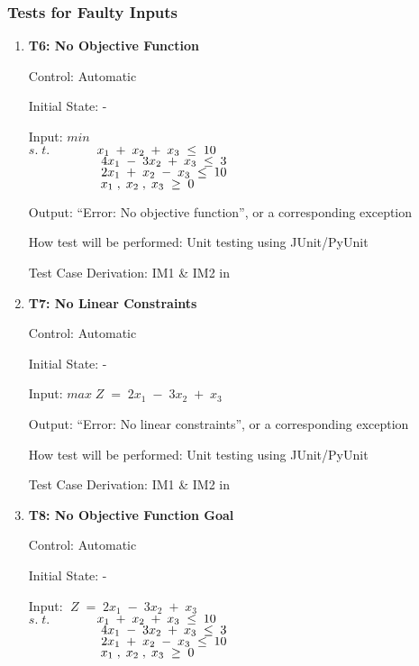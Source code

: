 \documentclass[12pt, titlepage]{article}
\begin{document}
\subsubsection{Tests for Faulty Inputs}

\begin{enumerate}
	\item{\textbf{T6: No Objective Function}}
	
	Control: Automatic
	
	Initial State: -
	
	Input: $min $\\
	$s.\;t.$$\hspace*{1.3cm} x_1\;+\;x_2\;+\;x_3\; \leq \;10$\\
	$\hspace*{2cm} 4x_1\;-\;3x_2\;+\;x_3\; \leq \;3$\\
	$\hspace*{2cm} 2x_1\;+\;x_2\;-\;x_3\; \leq \;10$\\
	$\hspace*{2cm} x_1\;,\;x_2\;,\;x_3\; \geq \;0$
	
	Output: ``Error: No objective function'', or a corresponding exception
	
	How test will be performed: Unit testing using JUnit/PyUnit
	
	Test Case Derivation: IM1 \& IM2 in \cite{losms-ca}
	
	\item{\textbf{T7: No Linear Constraints}}
	
	Control: Automatic
	
	Initial State: -
	
	Input: $max\;Z\;=\;2x_1\;-\;3x_2\;+\;x_3$
	
	Output: ``Error: No linear constraints'', or a corresponding exception
	
	How test will be performed: Unit testing using JUnit/PyUnit
	
	Test Case Derivation: IM1 \& IM2 in \cite{losms-ca}
	
	\item{\textbf{T8: No Objective Function Goal}}
	
	Control: Automatic
	
	Initial State: -
	
	Input: $\;Z\;=\;2x_1\;-\;3x_2\;+\;x_3$\\
	$s.\;t.$$\hspace*{1.3cm} x_1\;+\;x_2\;+\;x_3\; \leq \;10$\\
	$\hspace*{2cm} 4x_1\;-\;3x_2\;+\;x_3\; \leq \;3$\\
	$\hspace*{2cm} 2x_1\;+\;x_2\;-\;x_3\; \leq \;10$\\
	$\hspace*{2cm} x_1\;,\;x_2\;,\;x_3\; \geq \;0$
	

\end{enumerate}
\end{document}
